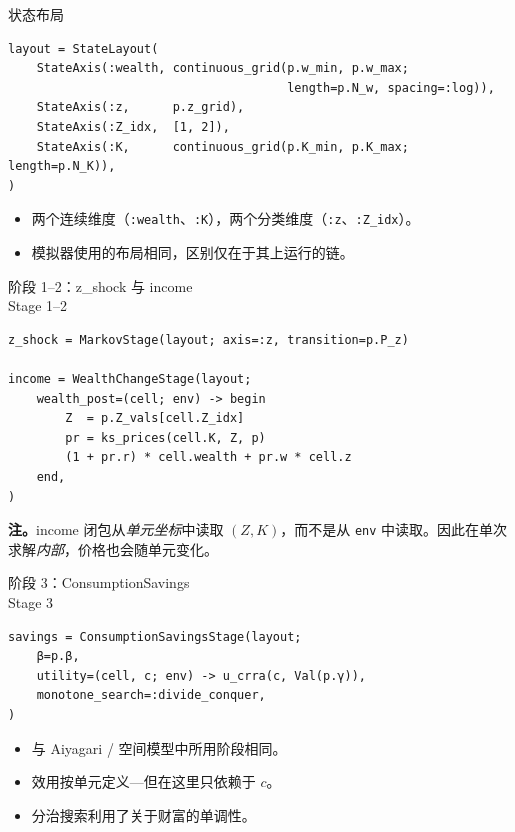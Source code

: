 \documentclass[10pt,aspectratio=169]{beamer}
\begin{document}
\begin{frame}[fragile]{状态布局}
\begin{lstlisting}
layout = StateLayout(
    StateAxis(:wealth, continuous_grid(p.w_min, p.w_max;
                                       length=p.N_w, spacing=:log)),
    StateAxis(:z,      p.z_grid),
    StateAxis(:Z_idx,  [1, 2]),
    StateAxis(:K,      continuous_grid(p.K_min, p.K_max; length=p.N_K)),
)
\end{lstlisting}

\vspace{0.4em}

\begin{itemize}
  \item 两个连续维度（\texttt{:wealth}、\texttt{:K}），两个分类维度（\texttt{:z}、\texttt{:Z\_idx}）。
  \item 模拟器使用的布局相同，区别仅在于其上运行的链。
\end{itemize}

\end{frame}

\begin{frame}[fragile]{阶段 1--2：z\_shock 与 income \\ Stage 1--2}
\begin{lstlisting}
z_shock = MarkovStage(layout; axis=:z, transition=p.P_z)

income = WealthChangeStage(layout;
    wealth_post=(cell; env) -> begin
        Z  = p.Z_vals[cell.Z_idx]
        pr = ks_prices(cell.K, Z, p)
        (1 + pr.r) * cell.wealth + pr.w * cell.z
    end,
)
\end{lstlisting}

\textbf{注。}income 闭包从\emph{单元坐标}中读取 $(Z, K)$，而不是从 \texttt{env} 中读取。因此在单次求解\emph{内部}，价格也会随单元变化。

\end{frame}

\begin{frame}[fragile]{阶段 3：ConsumptionSavings \\ Stage 3}
\begin{lstlisting}
savings = ConsumptionSavingsStage(layout;
    β=p.β,
    utility=(cell, c; env) -> u_crra(c, Val(p.γ)),
    monotone_search=:divide_conquer,
)
\end{lstlisting}

\vspace{0.4em}

\begin{itemize}
  \item 与 Aiyagari / 空间模型中所用阶段相同。
  \item 效用按单元定义---但在这里只依赖于 $c$。
  \item 分治搜索利用了关于财富的单调性。
\end{itemize}

\end{frame}
\end{document}
